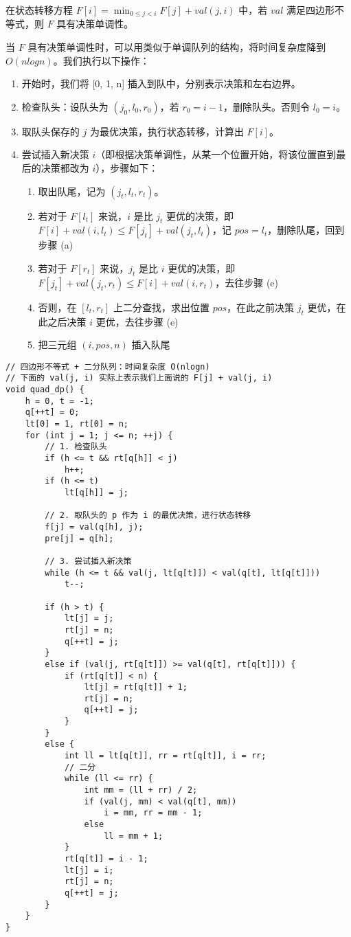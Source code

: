\documentclass[UTF8]{article}
\begin{document}
在状态转移方程 $F[i] = \min_{0 \le j < i} {F[j] + val(j, i)}$ 中，若 $val$ 满足四边形不等式，则 $F$ 具有决策单调性。

当 $F$ 具有决策单调性时，可以用类似于单调队列的结构，将时间复杂度降到 $O(nlogn)$。我们执行以下操作：

\begin{enumerate}
	\item 开始时，我们将 [0, 1, n] 插入到队中，分别表示决策和左右边界。
	\item 检查队头：设队头为 $(j_0, l_0, r_0)$，若 $r_0 = i - 1$，删除队头。否则令 $l_0 = i$。
	\item 取队头保存的 $j$ 为最优决策，执行状态转移，计算出 $F[i]$。
	\item 尝试插入新决策 $i$（即根据决策单调性，从某一个位置开始，将该位置直到最后的决策都改为 $i$），步骤如下：		
	\begin{enumerate}
		\item 取出队尾，记为 $(j_t, l_t, r_t)$。
		\item 若对于 $F[l_t]$ 来说，$i$ 是比 $j_t$ 更优的决策，即 $F[i] + val(i, l_t) \le F[j_t] + val(j_t, l_t)$，记 $pos = l_t$，删除队尾，回到步骤 (a)
		\item 若对于 $F[r_t]$ 来说，$j_t$ 是比 $i$ 更优的决策，即 $F[j_t] + val(j_t, r_t) \le F[i] + val(i, r_t)$，去往步骤 (e)
		\item 否则，在 $[l_t, r_t]$ 上二分查找，求出位置 $pos$，在此之前决策 $j_t$ 更优，在此之后决策 $i$ 更优，去往步骤 (e)
		\item 把三元组 $(i, pos, n)$ 插入队尾
	\end{enumerate}
\end{enumerate}

\begin{lstlisting}[caption=四边形不等式优化一维 dp]
// 四边形不等式 + 二分队列：时间复杂度 O(nlogn)
// 下面的 val(j, i) 实际上表示我们上面说的 F[j] + val(j, i)
void quad_dp() {
	h = 0, t = -1;
	q[++t] = 0;
	lt[0] = 1, rt[0] = n;
	for (int j = 1; j <= n; ++j) {
		// 1. 检查队头
		if (h <= t && rt[q[h]] < j)
			h++;
		if (h <= t)
			lt[q[h]] = j;
		
		// 2. 取队头的 p 作为 i 的最优决策，进行状态转移
		f[j] = val(q[h], j);
		pre[j] = q[h];

		// 3. 尝试插入新决策
		while (h <= t && val(j, lt[q[t]]) < val(q[t], lt[q[t]]))
			t--;

		if (h > t) {
			lt[j] = j;
			rt[j] = n;
			q[++t] = j;
		}
		else if (val(j, rt[q[t]]) >= val(q[t], rt[q[t]])) {
			if (rt[q[t]] < n) {
				lt[j] = rt[q[t]] + 1;
				rt[j] = n;
				q[++t] = j;
			}
		}
		else {
			int ll = lt[q[t]], rr = rt[q[t]], i = rr;
			// 二分
			while (ll <= rr) {
				int mm = (ll + rr) / 2;
				if (val(j, mm) < val(q[t], mm))
					i = mm, rr = mm - 1;
				else
					ll = mm + 1;
			}
			rt[q[t]] = i - 1;
			lt[j] = i;
			rt[j] = n;
			q[++t] = j;
		}
	}
}
\end{lstlisting}
\end{document}
